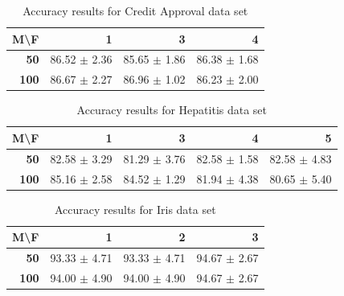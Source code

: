 \documentclass[journal, a4paper]{IEEEtran}
\begin{document}
\begin{table}[htbp]
\caption{Accuracy results for Credit Approval data set}
\begin{center}
\begin{tabular}{|r|r|r|r|}
\hline
\textbf{M\textbackslash{}F} & \textbf{1} & \textbf{3} & \textbf{4} \\ \hline
\textbf{50} & 86.52 $ \pm $ 2.36 & 85.65 $ \pm $ 1.86 & 86.38 $ \pm $ 1.68 \\ \hline
\textbf{100} & 86.67 $ \pm $ 2.27 & 86.96 $ \pm $ 1.02 & 86.23 $ \pm $ 2.00 \\ \hline
\end{tabular}
\end{center}
\label{tab:acc-crx}
\end{table}

\begin{table}[htbp]
\caption{Accuracy results for Hepatitis data set}
\begin{center}
\begin{tabular}{|r|r|r|r|r|}
\hline
\textbf{M\textbackslash{}F} & \multicolumn{1}{r|}{\textbf{1}} & \multicolumn{1}{r|}{\textbf{3}} & \multicolumn{1}{r|}{\textbf{4}} & \multicolumn{1}{r|}{\textbf{5}} \\ \hline
\textbf{50} & 82.58 $ \pm $ 3.29 & 81.29 $ \pm $ 3.76 & 82.58 $ \pm $ 1.58 & 82.58 $ \pm $ 4.83 \\ \hline
\textbf{100} & 85.16 $ \pm $ 2.58 & 84.52 $ \pm $ 1.29 & 81.94 $ \pm $ 4.38 & 80.65 $ \pm $ 5.40 \\ \hline
\end{tabular}
\end{center}
\label{tab:acc-hepatitis}
\end{table}

\begin{table}[htbp]
\caption{Accuracy results for Iris data set}
\begin{center}
\begin{tabular}{|r|r|r|r|}
\hline
\textbf{M\textbackslash{}F} & \textbf{1} & \textbf{2} & \textbf{3} \\ \hline
\textbf{50} & 93.33 $ \pm $ 4.71 & 93.33 $ \pm $ 4.71 & 94.67 $ \pm $ 2.67 \\ \hline
\textbf{100} & 94.00 $ \pm $ 4.90 & 94.00 $ \pm $ 4.90 & 94.67 $ \pm $ 2.67 \\ \hline
\end{tabular}
\end{center}
\label{tab:acc-iris}
\end{table}
\end{document}
